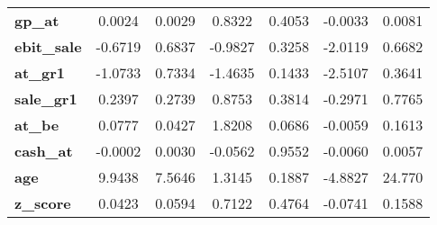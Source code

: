 \begin{tabular}{lcccccc}
\textbf{gp\_at}         &       0.0024       &       0.0029       &      0.8322     &      0.4053      &      -0.0033      &       0.0081       \\
\textbf{ebit\_sale}     &      -0.6719       &       0.6837       &     -0.9827     &      0.3258      &      -2.0119      &       0.6682       \\
\textbf{at\_gr1}        &      -1.0733       &       0.7334       &     -1.4635     &      0.1433      &      -2.5107      &       0.3641       \\
\textbf{sale\_gr1}      &       0.2397       &       0.2739       &      0.8753     &      0.3814      &      -0.2971      &       0.7765       \\
\textbf{at\_be}         &       0.0777       &       0.0427       &      1.8208     &      0.0686      &      -0.0059      &       0.1613       \\
\textbf{cash\_at}       &      -0.0002       &       0.0030       &     -0.0562     &      0.9552      &      -0.0060      &       0.0057       \\
\textbf{age}            &       9.9438       &       7.5646       &      1.3145     &      0.1887      &      -4.8827      &       24.770       \\
\textbf{z\_score}       &       0.0423       &       0.0594       &      0.7122     &      0.4764      &      -0.0741      &       0.1588       \\
\bottomrule
\end{tabular}

